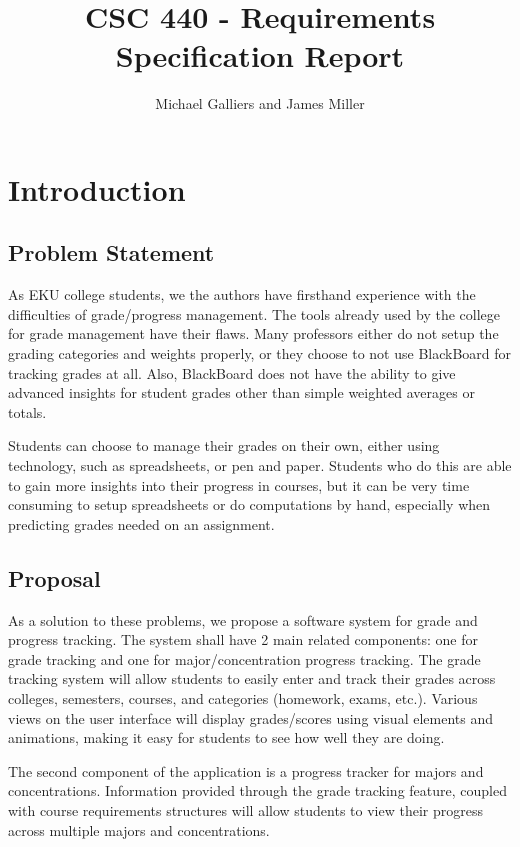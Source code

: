 \documentclass[12pt]{article}
\author{Michael Galliers and James Miller}
\title{CSC 440 - Requirements Specification Report}
\begin{document}
\begin{titlepage}
\maketitle
\end{titlepage}

\newpage
    \tableofcontents
\newpage

\section{Introduction}
\subsection{Problem Statement}
As EKU college students, we the authors have firsthand experience with the difficulties of
grade/progress management. The tools already used by the college for grade management have their
flaws. Many professors either do not setup the grading categories and weights properly, or they
choose to not use BlackBoard for tracking grades at all. Also, BlackBoard does not have the ability
to give advanced insights for student grades other than simple weighted averages or totals.

Students can choose to manage their grades on their own, either using technology, such as
spreadsheets, or pen and paper. Students who do this are able to gain more insights into their
progress in courses, but it can be very time consuming to setup spreadsheets or do computations by
hand, especially when predicting grades needed on an assignment.

\subsection{Proposal}
As a solution to these problems, we propose a software system for grade and progress tracking. The
system shall have 2 main related components: one for grade tracking and one for major/concentration
progress tracking. The grade tracking system will allow students to easily enter and track their
grades across colleges, semesters, courses, and categories (homework, exams, etc.). Various views on
the user interface will display grades/scores using visual elements and animations, making it easy
for students to see how well they are doing.

The second component of the application is a progress tracker for majors and concentrations.
Information provided through the grade tracking feature, coupled with course requirements structures
will allow students to view their progress across multiple majors and concentrations.
\end{document}
